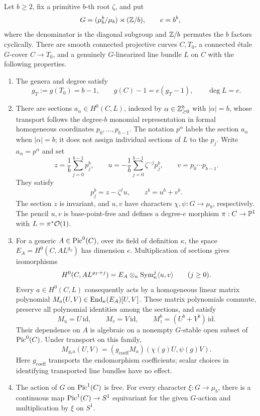 \begin{proposition}\label{prop:binary-curves}
Let \(b\ge2\), fix a primitive \(b\)-th root \(\zeta\), and put
\[
 G=(\mu_b^b/\mu_b)\rtimes(\mathbb Z/b),\qquad e=b^b,
\]
where the denominator is the diagonal subgroup and \(\mathbb Z/b\) permutes
the \(b\) factors cyclically.  There are smooth connected projective
curves \(C,T_0\), a connected \'etale \(G\)-cover \(C\to T_0\), and a
genuinely \(G\)-linearized line bundle \(L\) on \(C\) with the following
properties.
\begin{enumerate}[label=\textup{(\roman*)}]
\item The genera and degree satisfy
\[
 g_T:=g(T_0)=b-1,\qquad g(C)-1=e(g_T-1),\qquad \deg L=e.
\]
\item There are sections \(a_\alpha\in H^0(C,L)\), indexed by
\(\alpha\in\mathbb Z_{\ge0}^b\) with \(|\alpha|=b\), whose transport follows
the degree-\(b\) monomial representation in formal homogeneous
coordinates \(p_0,\ldots,p_{b-1}\). The notation \(p^\alpha\) labels
the section \(a_\alpha\) when \(|\alpha|=b\); it does not assign
individual sections of \(L\) to the \(p_j\). Write \(a_\alpha=p^\alpha\)
and set
\[
 z=\frac1b\sum_{j=0}^{b-1}p_j^b,\qquad
 u=-\frac1b\sum_{j=0}^{b-1}\zeta^{-j}p_j^b,\qquad
 v=p_0\cdots p_{b-1}.
\]
They satisfy
\begin{equation}\label{eq:binary-section-relations}
 p_j^b=z-\zeta^ju,\qquad z^b=u^b+v^b.
\end{equation}
The section \(z\) is invariant, and \(u,v\) have characters
\(\chi,\psi:G\to\mu_b\), respectively.  The pencil \(u,v\) is
base-point-free and defines a degree-\(e\) morphism
\(\pi:C\to\mathbb P^1\) with \(L=\pi^*\mathcal O(1)\).
\item For a generic \(A\in\operatorname{Pic}^0(C)\), over its field of definition
\(\kappa\), the space \(E_A=H^0(C,A L^{g_T})\) has dimension \(e\).
Multiplication of sections gives isomorphisms
\begin{equation}\label{eq:curve-free-module}
 H^0(C,A L^{g_T+j})
   =E_A\otimes_\kappa\operatorname{Sym}^j_\kappa\langle u,v\rangle
       \qquad(j\ge0).
\end{equation}
Every \(a\in H^0(C,L)\) consequently acts by a homogeneous linear
matrix polynomial \(M_a(U,V)\in\operatorname{End}_\kappa(E_A)[U,V]\).
These matrix polynomials commute, preserve all polynomial identities
among the sections, and satisfy
\[
 M_u=U\,\mathrm{id},\qquad M_v=V\,\mathrm{id},\qquad
 M_z^b=(U^b+V^b)\,\mathrm{id}.
\]
Their dependence on \(A\) is algebraic on a nonempty \(G\)-stable
open subset of \(\operatorname{Pic}^0(C)\).  Under transport on this family,
\begin{equation}\label{eq:matrix-transport}
 M_{g_*a}(U,V)
     =(g_{\mathrm{coeff}}M_a)(\chi(g)U,\psi(g)V).
\end{equation}
Here \(g_{\mathrm{coeff}}\) transports the endomorphism coefficients;
scalar choices in identifying transported line bundles have no effect.
\item The action of \(G\) on \(\operatorname{Pic}^1(C)\) is free.  For every character
\(\xi:G\to\mu_b\), there is a continuous map
\(\operatorname{Pic}^1(C)\to S^1\) equivariant for the given \(G\)-action and
multiplication by \(\xi\) on \(S^1\).
\end{enumerate}
\end{proposition}

